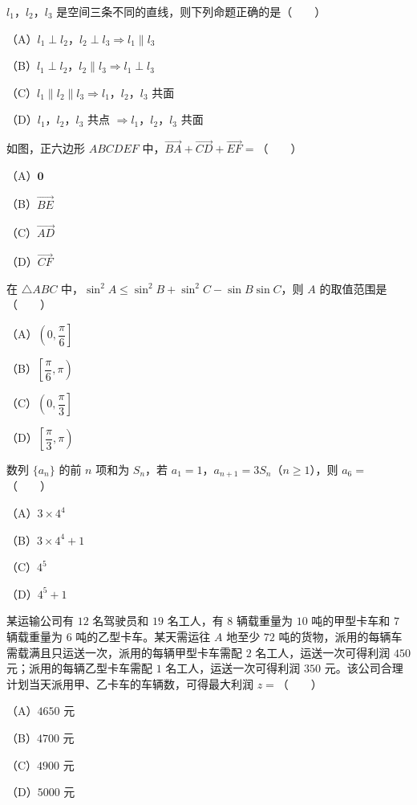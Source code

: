 \begin{question}
$l_1$，$l_2$，$l_3$ 是空间三条不同的直线，则下列命题正确的是\mbox{（　　）}

（A）$l_1\perp l_2$，$l_2\perp l_3\Rightarrow l_1\parallel l_3$

（B）$l_1\perp l_2$，$l_2\parallel l_3\Rightarrow l_1\perp l_3$

（C）$l_1\parallel l_2\parallel l_3\Rightarrow l_1$，$l_2$，$l_3$ 共面

（D）$l_1$，$l_2$，$l_3$ 共点 $\Rightarrow l_1$，$l_2$，$l_3$ 共面

\Needspace{0.4\textheight}
\end{question}
\begin{question}
如图，正六边形 $ABCDEF$ 中，$\overrightarrow{BA}+\overrightarrow{CD}+\overrightarrow{EF}=$\mbox{（　　）}

（A）$\boldsymbol 0$

（B）$\overrightarrow{BE}$

（C）$\overrightarrow{AD}$

（D）$\overrightarrow{CF}$
\nopagebreak[4]
\begin{center}\end{center}
\nopagebreak[4]
\end{question}
\begin{question}
在 $\triangle ABC$ 中，$\sin^2A\leqslant\sin^2B+\sin^2C-\sin B\sin C$，则 $A$ 的取值范围是\mbox{（　　）}

（A）$\left(0,\dfrac{\pi}{6}\right]$

（B）$\left[\dfrac{\pi}{6},\pi\right)$

（C）$\left(0,\dfrac{\pi}{3}\right]$

（D）$\left[\dfrac{\pi}{3},\pi\right)$

\end{question}
\begin{question}
数列 $\{a_n\}$ 的前 $n$ 项和为 $S_n$，若 $a_1=1$，$a_{n+1}=3S_n$（$n\geqslant1$），则 $a_6=$\mbox{（　　）}

（A）$3\times4^4$

（B）$3\times4^4+1$

（C）$4^5$

（D）$4^5+1$

\end{question}
\begin{question}
某运输公司有 $12$ 名驾驶员和 $19$ 名工人，有 $8$ 辆载重量为 $10$ 吨的甲型卡车和 $7$ 辆载重量为 $6$ 吨的乙型卡车。某天需运往 $A$ 地至少 $72$ 吨的货物，派用的每辆车需载满且只运送一次，派用的每辆甲型卡车需配 $2$ 名工人，运送一次可得利润 $450$ 元；派用的每辆乙型卡车需配 $1$ 名工人，运送一次可得利润 $350$ 元。该公司合理计划当天派用甲、乙卡车的车辆数，可得最大利润 $z=$\mbox{（　　）}

（A）$4650$ 元

（B）$4700$ 元

（C）$4900$ 元

（D）$5000$ 元

\end{question}
